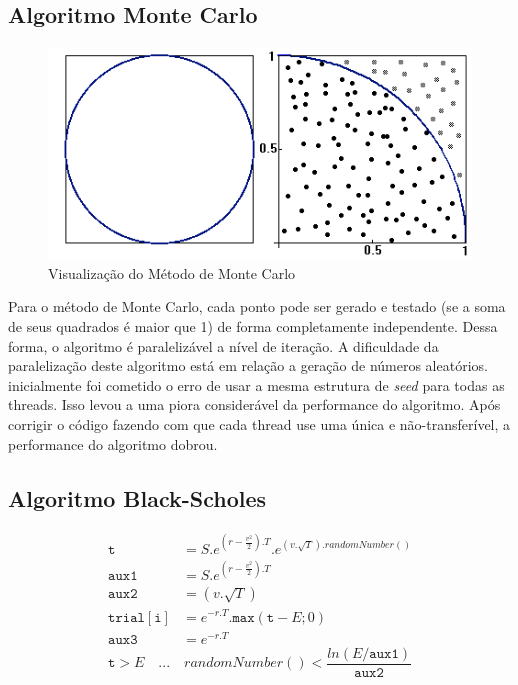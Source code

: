 \documentclass[12pt]{article}
\begin{document}
\subsection{Algoritmo Monte Carlo}

\begin{figure}[h]
	\centering
	\includegraphics[width=.8\textwidth]{fig02.png}
	\caption{Visualização do Método de Monte Carlo}
	\label{fig:MonteCarloFig01}
\end{figure}
	
Para o método de Monte Carlo, cada ponto pode ser gerado e testado (se a soma de seus quadrados
é maior que 1) de forma completamente independente. Dessa forma, o algoritmo é paralelizável
a nível de iteração. A dificuldade da paralelização deste algoritmo está em relação a geração
de números aleatórios. inicialmente foi cometido o erro de usar a mesma estrutura de
\textit{seed} para todas as threads. Isso levou a uma piora considerável da performance
do algoritmo. Após corrigir o código fazendo com que cada thread use uma única e
não-transferível, a performance do algoritmo dobrou.\\


\subsection{Algoritmo Black-Scholes}

\begin{equation}
	\begin{aligned}
		\mathtt{t}			&= S.e^{(r-\frac{v^2}{2}).T}.e^{(v.\sqrt{T}).randomNumber()}\\
		\mathtt{aux1}		&= S.e^{(r-\frac{v^2}{2}).T}\\
		\mathtt{aux2}		&= (v.\sqrt{T})\\
		\mathtt{trial[i]}	&= e^{-r.T}.\mathtt{max}(\mathtt{t}-E;0)\\
		\mathtt{aux3}		&= e^{-r.T}
	\end{aligned}
\end{equation}
\begin{equation}
	\mathtt{t}>E \quad ... \quad randomNumber() < \frac{ln(E/\mathtt{aux1})}{\mathtt{aux2}}
	\label{sec:validityCondition}
\end{equation}
\end{document}
